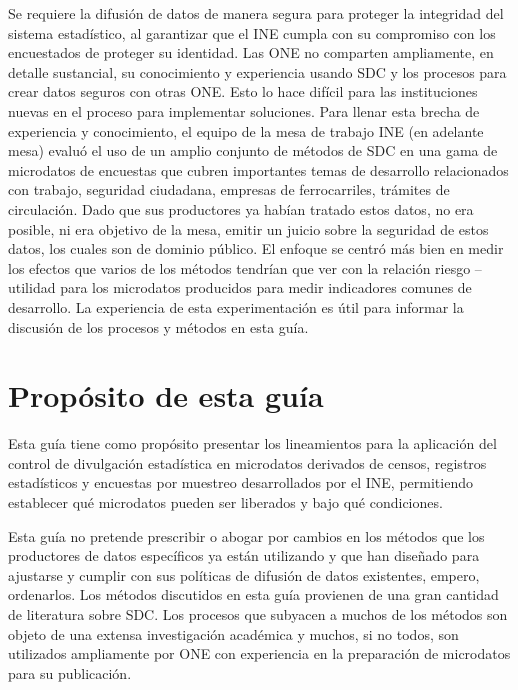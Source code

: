 \documentclass[
]{book}
\theoremstyle{definition}
\theoremstyle{definition}
\theoremstyle{definition}
\theoremstyle{definition}
\theoremstyle{remark}
\begin{document}
Se requiere la difusión de datos de manera segura para proteger la integridad del sistema estadístico, al garantizar que el INE cumpla con su compromiso con los encuestados de proteger su identidad. Las ONE no comparten ampliamente, en detalle sustancial, su conocimiento y experiencia usando SDC y los procesos para crear datos seguros con otras ONE. Esto lo hace difícil para las instituciones nuevas en el proceso para implementar soluciones. Para llenar esta brecha de experiencia y conocimiento, el equipo de la mesa de trabajo INE (en adelante mesa) evaluó el uso de un amplio conjunto de métodos de SDC en una gama de microdatos de encuestas que cubren importantes temas de desarrollo relacionados con trabajo, seguridad ciudadana, empresas de ferrocarriles, trámites de circulación. Dado que sus productores ya habían tratado estos datos, no era posible, ni era objetivo de la mesa, emitir un juicio sobre la seguridad de estos datos, los cuales son de dominio público. El enfoque se centró más bien en medir los efectos que varios de los métodos tendrían que ver con la relación riesgo -- utilidad para los microdatos producidos para medir indicadores comunes de desarrollo. La experiencia de esta experimentación es útil para informar la discusión de los procesos y métodos en esta guía.

\hypertarget{propuxf3sito-de-esta-guuxeda}{%
\section{Propósito de esta guía}\label{propuxf3sito-de-esta-guuxeda}}

Esta guía tiene como propósito presentar los lineamientos para la aplicación del control de divulgación estadística en microdatos derivados de censos, registros estadísticos y encuestas por muestreo desarrollados por el INE, permitiendo establecer qué microdatos pueden ser liberados y bajo qué condiciones.

Esta guía no pretende prescribir o abogar por cambios en los métodos que los productores de datos específicos ya están utilizando y que han diseñado para ajustarse y cumplir con sus políticas de difusión de datos existentes, empero, ordenarlos. Los métodos discutidos en esta guía provienen de una gran cantidad de literatura sobre SDC. Los procesos que subyacen a muchos de los métodos son objeto de una extensa investigación académica y muchos, si no todos, son utilizados ampliamente por ONE con experiencia en la preparación de microdatos para su publicación.
\end{document}
